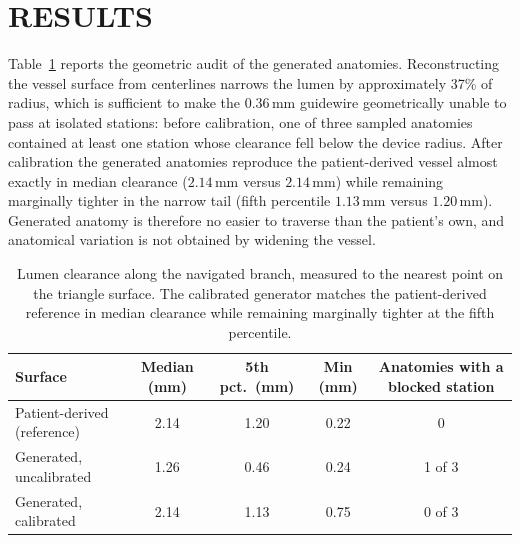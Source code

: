 %

\section{RESULTS}

Table~\ref{tab:clearance} reports the geometric audit of the generated anatomies. Reconstructing
the vessel surface from centerlines narrows the lumen by approximately 37\% of radius, which is
sufficient to make the $0.36$\,mm guidewire geometrically unable to pass at isolated stations:
before calibration, one of three sampled anatomies contained at least one station whose clearance
fell below the device radius. After calibration the generated anatomies reproduce the
patient-derived vessel almost exactly in median clearance ($2.14$\,mm versus $2.14$\,mm) while
remaining marginally tighter in the narrow tail (fifth percentile $1.13$\,mm versus $1.20$\,mm).
Generated anatomy is therefore no easier to traverse than the patient's own, and anatomical
variation is not obtained by widening the vessel.

\begin{table}[ht]
\caption{Lumen clearance along the navigated branch, measured to the nearest point on the
triangle surface. The calibrated generator matches the patient-derived reference in median
clearance while remaining marginally tighter at the fifth percentile.}
\label{tab:clearance}
\begin{center}
\begin{tabular}{lcccc}
\toprule
Surface & Median (mm) & 5th pct.\ (mm) & Min (mm) & Anatomies with a blocked station \\
\midrule
Patient-derived (reference) & 2.14 & 1.20 & 0.22 & 0 \\
Generated, uncalibrated     & 1.26 & 0.46 & 0.24 & 1 of 3 \\
Generated, calibrated       & 2.14 & 1.13 & 0.75 & 0 of 3 \\
\bottomrule
\end{tabular}
\end{center}
\end{table}

